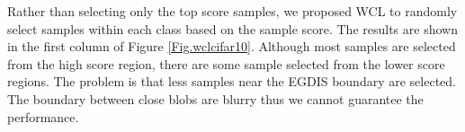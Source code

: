 Rather than selecting only the top score samples, we proposed WCL to randomly select samples within each class based on the sample score. The results are shown in the first column of Figure \ref{Fig.wclcifar10}. Although most samples are selected from the high score region, there are some sample selected from the lower score regions. The problem is that less samples near the EGDIS boundary are selected. The boundary between close blobs are blurry thus we cannot guarantee the performance.



\begin{figure}[H]
\centering  
{}


\end{figure}
